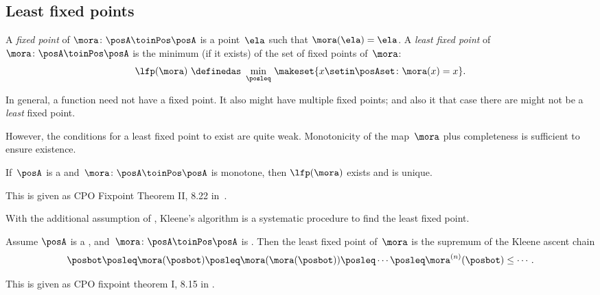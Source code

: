 \subsection{Least fixed points}

\begin{definition}
    \label{def:least-fixed}
    A \emph{fixed point} of $\mora\colon\posA\toinPos\posA$ is a point~$\ela$ such that $\mora(\ela)=\ela$.
    A \emph{least fixed point} of~$\mora\colon\posA\toinPos\posA$ is the minimum (if it exists) of the set of fixed points of~$\mora$:
    \begin{equation}
        \label{eq:lfp-one}
        \lfp(\mora)\,\,\definedas\,\,\min_{\posleq}\,\makeset{x\setin\posAset \colon \mora(x)=x}.
    \end{equation}
\end{definition}

In general, a function need not have a fixed point.
It also might have multiple fixed points; and also it that case there are might not be a \emph{least} fixed point.

However, the conditions for a least fixed point to exist are quite weak.
%
Monotonicity of the map~$\mora$ plus completeness is sufficient to ensure existence.

\begin{lemma}
    \label{lem:CPO-fix-point-2}
    If~$\posA$ is a \CPO and~$\mora\colon\posA\toinPos\posA$
    is monotone, then $\lfp(\mora)$ exists and is unique.
\end{lemma}
This is given as CPO Fixpoint Theorem II, 8.22 in~\cite{davey02}.

With the additional assumption of \scottcontinuity, Kleene's algorithm is a systematic procedure to find the least fixed point.

\begin{lemma}
    \label{lem:kleene-1}
    Assume $\posA$ is a \CPO, and~$\mora\colon\posA\toinPos\posA$ is \scottcontinuous.
    Then the least fixed point of~$\mora$ is the supremum of the Kleene ascent chain
    \begin{equation} \label{eq:kleene-iteration}
        \posbot\posleq \mora(\posbot)\posleq \mora(\mora(\posbot))\posleq\cdots\posleq \mora^{(n)}(\posbot)\leq\cdots.
    \end{equation}
\end{lemma}
This is given as CPO fixpoint theorem I, 8.15 in \cite{davey02}.

